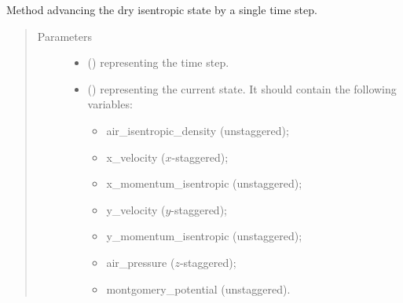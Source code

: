 \documentclass[letterpaper,10pt,english]{sphinxmanual}
\begin{document}
\begin{fulllineitems}
\begin{fulllineitems}
\begin{quote}
\begin{description}
\begin{itemize}
\end{itemize}

\end{description}\end{quote}

\end{fulllineitems}


\begin{fulllineitems}
\label{\detokenize{api:dycore.dycore_isentropic.DynamicalCoreIsentropic._carry_out_large_timestep_dry}}
Method advancing the dry isentropic state by a single time step.
\begin{quote}\begin{description}
\item[{Parameters}] \leavevmode\begin{itemize}
\item {} 
 () \textendash{}  representing the time step.

\item {} 
 () \textendash{} 
{\hyperref[\detokenize{api:storages.state_isentropic.StateIsentropic}]{}} representing the current state.
It should contain the following variables:
\begin{itemize}
\item {} 
air\_isentropic\_density (unstaggered);

\item {} 
x\_velocity (\(x\)-staggered);

\item {} 
x\_momentum\_isentropic (unstaggered);

\item {} 
y\_velocity (\(y\)-staggered);

\item {} 
y\_momentum\_isentropic (unstaggered);

\item {} 
air\_pressure (\(z\)-staggered);

\item {} 
montgomery\_potential (unstaggered).

\end{itemize}



\end{itemize}
\end{description}
\end{quote}
\end{fulllineitems}
\end{fulllineitems}
\end{document}
